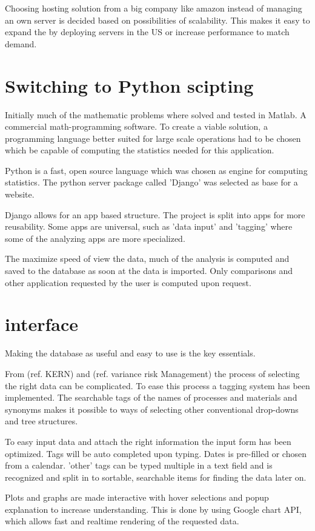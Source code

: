 \documentclass[aip,amsmath,reprint, author-year]{revtex4-1}
\begin{document}
Choosing hosting solution from a big company like amazon instead of managing an own server is decided based on possibilities of scalability. This makes it easy to expand the by deploying servers in the US or increase performance to match demand.

\section{Switching to Python scipting}
Initially much of the mathematic problems where solved and tested in Matlab. A commercial math-programming software. To create a viable solution, a programming language better suited for large scale operations had to be chosen which be capable of computing the statistics needed for this application.

Python is a fast, open source language which was chosen as engine for computing statistics. The python server package called 'Django' was selected as base for a website.

Django allows for an app based structure. The project is split into apps for more reusability. Some apps are universal, such as 'data input' and 'tagging' where some of the analyzing apps are more specialized.

The maximize speed of view the data, much of the analysis is computed and saved to the database as soon at the data is imported. Only comparisons and other application requested by the user is computed upon request.

\section{interface}
Making the database as useful and easy to use is the key essentials. 

From (ref. KERN) and (ref. variance risk Management) the process of selecting the right data can be complicated. To ease this process a tagging system has been implemented.
The searchable tags of the names of processes and materials and synonyms makes it possible to ways of selecting other conventional drop-downs and tree structures.

To easy input data and attach the right information the input form has been optimized. Tags will be auto completed upon typing. Dates is pre-filled or chosen from  a calendar. 'other' tags can be typed multiple in a text field and is recognized and split in to sortable, searchable items for finding the data later on.

Plots and graphs are made interactive with hover selections and popup explanation to increase understanding. This is done by using Google chart API, which allows fast and realtime rendering of the requested data.
\end{document}

